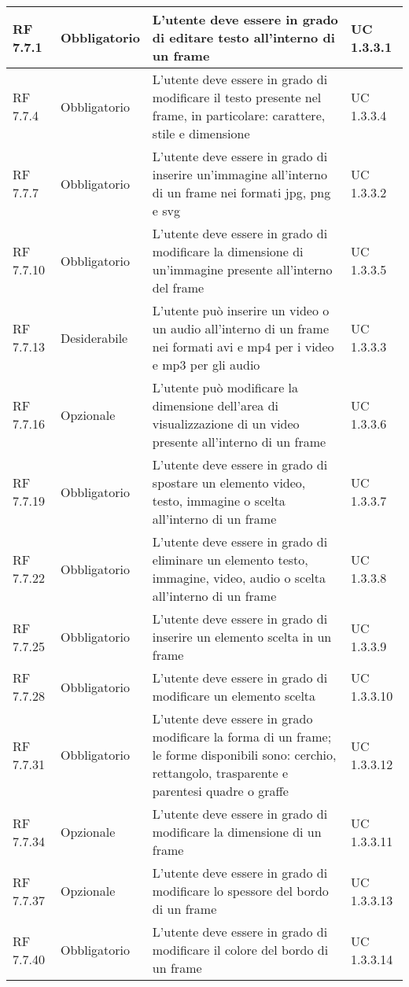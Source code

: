 {\begin{longtable} [c]{| p{2.5cm} | p{2.5cm} | p{6cm} |p{2.5cm}|}
 \hline 
RF 7.7.1 & Obbligatorio & L'utente deve essere in grado di editare testo all'interno di un frame & UC 1.3.3.1\\ 
 \hline 
RF 7.7.4 & Obbligatorio & L'utente deve essere in grado di modificare il testo presente nel frame, in particolare: carattere, stile e dimensione & UC 1.3.3.4\\ 
 \hline 
RF 7.7.7 & Obbligatorio & L'utente deve essere in grado di inserire un'immagine all'interno di un frame nei formati jpg, png e svg & UC 1.3.3.2\\ 
 \hline 
RF 7.7.10 & Obbligatorio & L'utente deve essere in grado di modificare la dimensione di un'immagine presente all'interno del frame & UC 1.3.3.5\\ 
 \hline 
RF 7.7.13 & Desiderabile & L'utente può inserire un video o un audio all'interno di un frame nei formati avi e mp4 per i video e mp3 per gli audio & UC 1.3.3.3\\ 
 \hline 
RF 7.7.16 & Opzionale & L'utente può modificare la dimensione dell'area di visualizzazione di un video presente all'interno di un frame & UC 1.3.3.6\\ 
 \hline 
RF 7.7.19 & Obbligatorio & L'utente deve essere in grado di spostare un elemento video, testo, immagine o scelta all'interno di un frame & UC 1.3.3.7\\ 
 \hline 
RF 7.7.22 & Obbligatorio & L'utente deve essere in grado di eliminare un elemento testo, immagine, video, audio o scelta all'interno di un frame & UC 1.3.3.8\\ 
 \hline 
RF 7.7.25 & Obbligatorio & L'utente deve essere in grado di inserire un elemento scelta in un frame & UC 1.3.3.9\\ 
 \hline 
RF 7.7.28 & Obbligatorio & L'utente deve essere in grado di modificare un elemento scelta & UC 1.3.3.10\\ 
 \hline 
RF 7.7.31 & Obbligatorio & L'utente deve essere in grado modificare la forma di un frame; le forme disponibili sono: cerchio, rettangolo, trasparente e parentesi quadre o graffe & UC 1.3.3.12\\ 
 \hline 
RF 7.7.34 & Opzionale & L'utente deve essere in grado di modificare la dimensione di un frame & UC 1.3.3.11\\ 
 \hline 
RF 7.7.37 & Opzionale & L'utente deve essere in grado di modificare lo spessore del bordo di un frame & UC 1.3.3.13\\ 
 \hline 
RF 7.7.40 & Obbligatorio & L'utente deve essere in grado di modificare il colore del bordo di un frame & UC 1.3.3.14\\ 

\end{longtable}}
